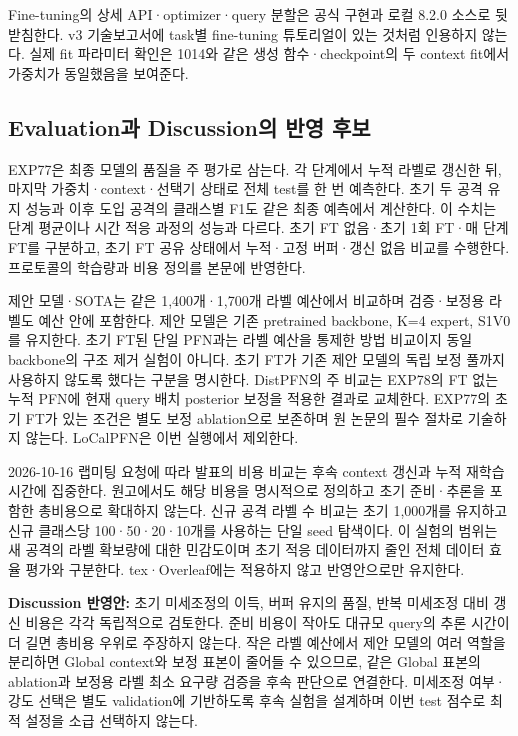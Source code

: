 Fine-tuning의 상세 API·optimizer·query 분할은 공식 구현과 로컬 8.2.0 소스로 뒷받침한다. v3 기술보고서에 task별 fine-tuning 튜토리얼이 있는 것처럼 인용하지 않는다. 실제 fit 파라미터 확인은 1014와 같은 생성 함수·checkpoint의 두 context fit에서 가중치가 동일했음을 보여준다.

\subsection{Evaluation과 Discussion의 반영 후보}
EXP77은 최종 모델의 품질을 주 평가로 삼는다. 각 단계에서 누적 라벨로 갱신한 뒤, 마지막 가중치·context·선택기 상태로 전체 test를 한 번 예측한다. 초기 두 공격 유지 성능과 이후 도입 공격의 클래스별 F1도 같은 최종 예측에서 계산한다. 이 수치는 단계 평균이나 시간 적응 과정의 성능과 다르다. 초기 FT 없음·초기 1회 FT·매 단계 FT를 구분하고, 초기 FT 공유 상태에서 누적·고정 버퍼·갱신 없음 비교를 수행한다. 프로토콜의 학습량과 비용 정의를 본문에 반영한다.

제안 모델·SOTA는 같은 1,400개·1,700개 라벨 예산에서 비교하며 검증·보정용 라벨도 예산 안에 포함한다. 제안 모델은 기존 pretrained backbone, K=\allowbreak{}4 expert, S1V0를 유지한다. 초기 FT된 단일 PFN과는 라벨 예산을 통제한 방법 비교이지 동일 backbone의 구조 제거 실험이 아니다. 초기 FT가 기존 제안 모델의 독립 보정 풀까지 사용하지 않도록 했다는 구분을 명시한다. DistPFN의 주 비교는 EXP78의 FT 없는 누적 PFN에 현재 query 배치 posterior 보정을 적용한 결과로 교체한다. EXP77의 초기 FT가 있는 조건은 별도 보정 ablation으로 보존하며 원 논문의 필수 절차로 기술하지 않는다. LoCalPFN은 이번 실행에서 제외한다.

2026-10-16 랩미팅 요청에 따라 발표의 비용 비교는 후속 context 갱신과 누적 재학습 시간에 집중한다. 원고에서도 해당 비용을 명시적으로 정의하고 초기 준비·추론을 포함한 총비용으로 확대하지 않는다. 신규 공격 라벨 수 비교는 초기 1,000개를 유지하고 신규 클래스당 100·50·20·10개를 사용하는 단일 seed 탐색이다. 이 실험의 범위는 새 공격의 라벨 확보량에 대한 민감도이며 초기 적응 데이터까지 줄인 전체 데이터 효율 평가와 구분한다. tex·Overleaf에는 적용하지 않고 반영안으로만 유지한다.

\textbf{Discussion 반영안:} 초기 미세조정의 이득, 버퍼 유지의 품질, 반복 미세조정 대비 갱신 비용은 각각 독립적으로 검토한다. 준비 비용이 작아도 대규모 query의 추론 시간이 더 길면 총비용 우위로 주장하지 않는다. 작은 라벨 예산에서 제안 모델의 여러 역할을 분리하면 Global context와 보정 표본이 줄어들 수 있으므로, 같은 Global 표본의 ablation과 보정용 라벨 최소 요구량 검증을 후속 판단으로 연결한다. 미세조정 여부·강도 선택은 별도 validation에 기반하도록 후속 실험을 설계하며 이번 test 점수로 최적 설정을 소급 선택하지 않는다.


